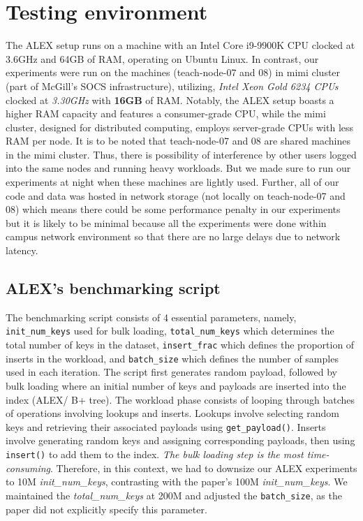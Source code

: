 \documentclass[12pt,a4paper]{article}
\begin{document}
\section{Testing environment}
The ALEX setup runs on a machine with an Intel Core i9-9900K CPU clocked at 3.6GHz and 64GB of RAM, operating on Ubuntu Linux. In contrast, our experiments were run on the machines (teach-node-07 and 08) in mimi cluster (part of McGill's SOCS infrastructure), utilizing, \emph{Intel Xeon Gold 6234 CPUs} clocked at \emph{3.30GHz} with \textbf{16GB} of RAM. Notably, the ALEX setup boasts a higher RAM capacity and features a consumer-grade CPU, while the mimi cluster, designed for distributed computing, employs server-grade CPUs with less RAM per node. It is to be noted that teach-node-07 and 08 are shared machines in the mimi cluster. Thus, there is possibility of interference by other users logged into the same nodes and running heavy workloads. But we made sure to run our experiments at night when these machines are lightly used. Further, all of our code and data was hosted in network storage (not locally on teach-node-07 and 08) which means there could be some performance penalty in our experiments but it is likely to be minimal because all the experiments were done within campus network environment so that there are no large delays due to network latency.



\subsection{ALEX's benchmarking script}
\noindent The benchmarking script consists of 4 essential parameters, namely, \texttt{init\_num\_keys} used for bulk loading, \texttt{total\_num\_keys} which determines the total number of keys in the dataset, \texttt{insert\_frac} which defines the proportion of inserts in the workload, and \texttt{batch\_size} which defines the number of samples used in each iteration.
The script first generates random payload, followed by bulk loading where an initial number of keys and payloads are inserted into the index (ALEX/ B+ tree). The workload phase consists of looping through batches of operations involving lookups and inserts. Lookups involve selecting random keys and retrieving their associated payloads using \texttt{get\_payload()}. Inserts involve generating random keys and assigning corresponding payloads, then using \texttt{insert()} to add them to the index. 
\emph{The bulk loading step is the most time-consuming}. Therefore, in this context, we had to downsize our ALEX experiments to 10M \emph{init\_num\_keys}, contrasting with the paper's 100M \emph{init\_num\_keys}. We maintained the \emph{total\_num\_keys} at 200M and adjusted the \texttt{batch\_size}, as the paper did not explicitly specify this parameter.
\end{document}
